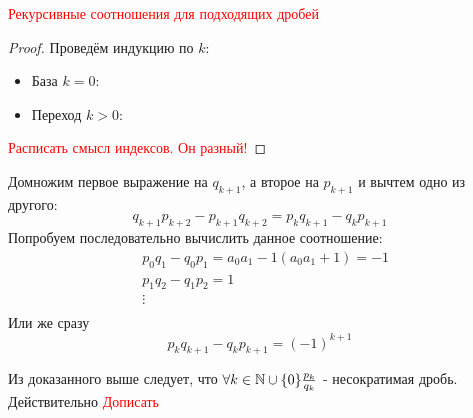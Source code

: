\begin{theorem}
	\textcolor{red}{Рекурсивные соотношения для подходящих дробей}
\end{theorem}

\begin{proof}
	Проведём индукцию по $k$:
	\begin{itemize}
		\item База $k = 0$:
		
		\item Переход $k > 0$:
	\end{itemize}
	\textcolor{red}{Расписать смысл индексов. Он разный!}
\end{proof}

\begin{corollary}
	Домножим первое выражение на $q_{k + 1}$, а второе на $p_{k + 1}$ и вычтем одно из другого:
	\[
		q_{k + 1} p_{k + 2} - p_{k + 1} q_{k + 2} = p_k q_{k + 1} - q_k p_{k + 1}
	\]
	Попробуем последовательно вычислить данное соотношение:
	\begin{align*}
		&{p_0 q_1 - q_0 p_1 = a_0 a_1 - 1(a_0 a_1 + 1) = -1}
		\\
		&{p_1 q_2 - q_1 p_2 = 1}
		\\
		&{\vdots}
		\\
		&{}
	\end{align*}
	Или же сразу
	\[
		p_k q_{k + 1} - q_k p_{k + 1} = (-1)^{k + 1}
	\]
\end{corollary}

\begin{corollary}
	Из доказанного выше следует, что $\forall k \in \mathbb{N} \cup \{0\} \frac{p_k}{q_k}$ - несократимая дробь. Действительно
	\textcolor{red}{Дописать}
\end{corollary}